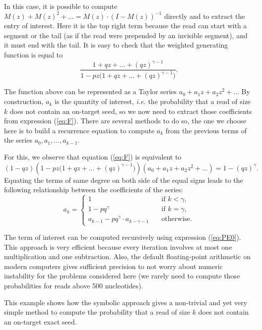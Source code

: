 \documentclass{article}
\begin{document}
In this case, it is possible to compute $M(z) + M(z)^2 + \ldots = M(z)
\cdot (I-M(z))^{-1}$ directly and to extract the entry of interest.
Here it is the top right term because the read can start with a segment or
the tail (as if the read were prepended by an invisible segment), and it
must end with the tail. It is easy to check that the weighted generating
function is equal to
\begin{equation}
\label{eq:F}
\frac{1+qz+\ldots+(qz)^{\gamma-1}}
  {1-pz \big(1+qz+\ldots+(qz)^{\gamma-1} \big)}.
\end{equation}

The function above can be represented as a Taylor series $a_0 + a_1z +
a_2z^2 + \ldots$ By construction, $a_k$ is the quantity of interest,
\textit{i.e.} the probability that a read of size $k$ does not contain an
on-target seed, so we now need to extract those coefficients from
expression (\ref{eq:F}). There are several methods to do so, the one we
choose here is to build a recurrence equation to compute $a_k$ from the
previous terms of the series $a_0, a_1, \ldots, a_{k-1}$.

For this, we observe that equation (\ref{eq:F}) is equivalent to
\begin{equation*}
(1-qz) \left(1-pz \big(1+qz+\ldots+(qz)^{\gamma-1} \big)\right)
(a_0 + a_1z +a_2z^2 + \ldots) = 1-(qz)^\gamma.
\end{equation*}
Equating the terms of same degree on both side of the equal signs leads
to the following relationship between the coefficients of the series:
\begin{equation}
\label{eq:PE0}
a_k = 
\begin{cases}
1            &\quad\text{if } k < \gamma, \\
1 -pq^\gamma &\quad\text{if } k = \gamma, \\
a_{k-1} -pq^\gamma \cdot a_{k-\gamma-1} &\quad\text{otherwise.}
\end{cases}
\end{equation}

The term of interest can be computed recursively using expression
(\ref{eq:PE0}). This approach is very efficient because every iteration
involves at most one multiplication and one subtraction. Also, the default
floating-point arithmetic on modern computers gives sufficient precision
to not worry about numeric instability for the problems considered here
(we rarely need to compute those probabilities for reads above 500
nucleotides).

This example shows how the symbolic approach gives a non-trivial and yet
very simple method to compute the probability that a read of size $k$ does
not contain an on-target exact seed.
\end{document}
